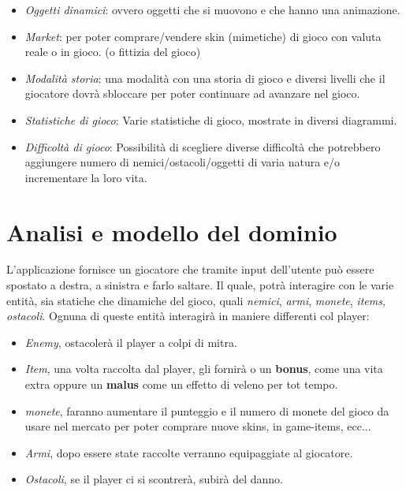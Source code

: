 \begin{itemize}
	\item \textsf{\small \emph{Oggetti dinamici}: ovvero oggetti che si muovono e che hanno una animazione.}
	\item \textsf{\small \emph{Market}: per poter comprare/vendere skin (mimetiche) di gioco con valuta reale o in gioco. (o fittizia del gioco)}
	\item \textsf{\small \emph{Modalità storia}: una modalità con una storia di gioco e diversi livelli che il giocatore dovrà sbloccare per poter continuare ad avanzare nel gioco.}
	\item \textsf{\small \emph{Statistiche di gioco}: Varie statistiche di gioco, mostrate in diversi diagrammi.}
	\item \textsf{\small \emph{Difficoltà di gioco}: Possibilità di scegliere diverse difficoltà che potrebbero aggiungere numero di nemici/ostacoli/oggetti di varia natura e/o incrementare la loro vita.}
\end{itemize}

\section{Analisi e modello del dominio}

\textsf{\small L'applicazione fornisce un giocatore che tramite input dell'utente può essere spostato a destra, a sinistra e farlo saltare. Il quale, potrà interagire con le varie entità, sia statiche che dinamiche del gioco, quali \emph{nemici}, \emph{armi}, \emph{monete}, \emph{items}, \emph{ostacoli}.
Ognuna di queste entità interagirà in maniere differenti col player: }\\

\begin{itemize}
	\item \textsf{\small \emph{Enemy}, ostacolerà il player a colpi di mitra.}
	\item \textsf{\small \emph{Item}, una volta raccolta dal player, gli fornirà o un \textbf{bonus}, come una vita extra oppure un \textbf{malus} come un effetto di veleno per tot tempo.}
	\item \textsf{\small \emph{monete}, faranno aumentare il punteggio e il numero di monete del gioco da usare nel mercato per poter comprare nuove skins, in game-items, ecc...}
	\item \textsf{\small \emph{Armi}, dopo essere state raccolte verranno equipaggiate al giocatore.}
	\item \textsf{\small \emph{Ostacoli}, se il player ci si scontrerà, subirà del danno.}
\end{itemize}

